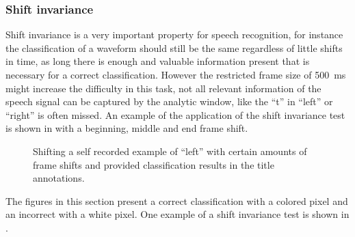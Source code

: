 \subsubsection{Shift invariance}
Shift invariance is a very important property for speech recognition, for instance the classification of a waveform should still be the same regardless of little shifts in time, as long there is enough and valuable information present that is necessary for a correct classification.
However the restricted frame size of \SI{500}{\milli\second} might increase the difficulty in this task, not all relevant information of the speech signal can be captured by the analytic window, like the \enquote{t} in \enquote{left} or \enquote{right} is often missed.
An example of the application of the shift invariance test is shown in  with a beginning, middle and end frame shift.
\begin{figure}[!ht]
  \centering
  \caption{Shifting a self recorded example of \enquote{left} with certain amounts of frame shifts and provided classification results in the title annotations.}
  \label{fig:exp_details_tb_shift_left}
\end{figure}
\FloatBarrier
\noindent
The figures in this section present a correct classification with a colored pixel and an incorrect with a white pixel.
One example of a shift invariance test is shown in .
